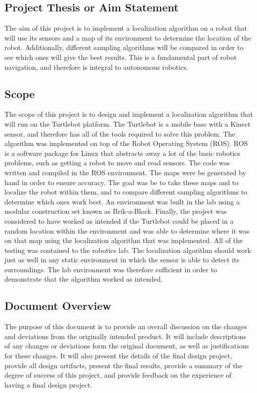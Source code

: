 \documentclass{article}
\newcommand\tab[1][0.5cm]{\hspace*{#1}}
\begin{document}
\subsection{Project Thesis or Aim Statement}
\tab The aim of this project is to implement a localization algorithm on a robot that will use its sensors and a map of its environment to determine the location of the robot. Additionally, different sampling algorithms will be compared in order to see which ones will give the best results. This is a fundamental part of robot navigation, and therefore is integral to autonomous robotics.

\subsection{Scope}
\tab The scope of this project is to design and implement a localization algorithm that will run on the Turtlebot platform. The Turtlebot is a mobile base with a Kinect sensor, and therefore has all of the tools required to solve this problem. The algorithm was implemented on top of the Robot Operating System (ROS). ROS is a software package for Linux that abstracts away a lot of the basic robotics problems, such as getting a robot to move and read sensors\citep{ROS}. The code was written and compiled in the ROS environment. The maps were be generated by hand in order to ensure accuracy. The goal was be to take these maps and to localize the robot within them, and to compare different sampling algorithms to determine which ones work best. An environment was built in the lab using a modular construction set known as Brik-a-Block. Finally, the project was considered to have worked as intended if the Turtlebot could be placed in a random location within the environment and was able to determine where it was on that map using the localization algorithm that was implemented. All of the testing was contained to the robotics lab. The localization algorithm should work just as well in any static environment in which the sensor is able to detect its surroundings. The lab environment was therefore sufficient in order to demonstrate that the algorithm worked as intended.

\subsection{Document Overview}
\tab The purpose of this document is to provide an overall discussion on the changes and deviations from the originally intended product. It will include descriptions of any changes or deviations form the original document, as well as justifications for these changes. It will also present the details of the final design project, provide all design artifacts, present the final results, provide a summary of the degree of success of this project, and provide feedback on the experience of having a final design project.
\end{document}
